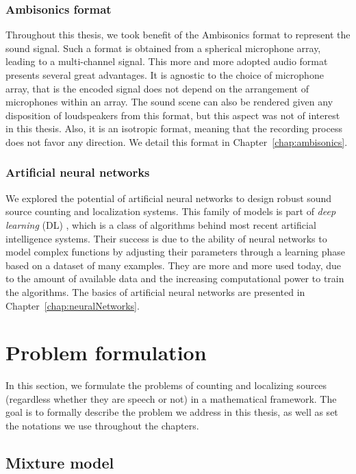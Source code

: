 \subsubsection{Ambisonics format}
Throughout this thesis, we took benefit of the Ambisonics format to represent the sound signal. Such a format is obtained from a spherical microphone array, leading to a multi-channel signal. This more and more adopted audio format presents several great advantages. It is agnostic to the choice of microphone array, that is the encoded signal does not depend on the arrangement of microphones within an array. The sound scene can also be rendered given any disposition of loudspeakers from this format, but this aspect was not of interest in this thesis. Also, it is an isotropic format, meaning that the recording process does not favor any direction. We detail this format in Chapter~\ref{chap:ambisonics}.

\subsubsection{Artificial neural networks}
We explored the potential of artificial neural networks to design robust sound source counting and localization systems. This family of models is part of \textit{deep learning} (DL) \cite{goodfellow_deep_2016}, which is a class of algorithms behind most recent artificial intelligence systems. Their success is due to the ability of neural networks to model complex functions by adjusting their parameters through a learning phase based on a dataset of many examples. They are more and more used today, due to the amount of available data and the increasing computational power to train the algorithms. The basics of artificial neural networks are presented in Chapter~\ref{chap:neuralNetworks}.

\section{Problem formulation}

In this section, we formulate the problems of counting and localizing sources (regardless whether they are speech or not) in a mathematical framework. The goal is to formally describe the problem we address in this thesis, as well as set the notations we use throughout the chapters. 

\subsection{Mixture model}

